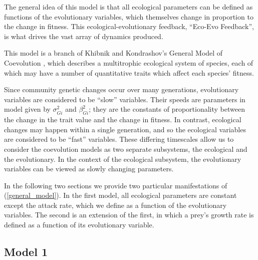 \documentclass{amsart}
\theoremstyle{definition}
\theoremstyle{remark}
\numberwithin{equation}{section}
\begin{document}
The general idea of this model is that all ecological parameters can be defined as functions of the evolutionary variables, which themselves change in proportion to the change in fitness.  This ecological-evolutionary feedback, ``Eco-Evo Feedback'', is what drives the vast array of dynamics produced.

This model is a branch of Khibnik and Kondrashov's General Model of Coevolution \cite{Khibnik_Kondrashov_1997}, which describes a multitrophic ecological system of species, each of which may have a number of quantitative traits which affect each species' fitness.

Since community genetic changes occur over many generations, evolutionary variables are considered to be ``slow'' variables.  Their speeds are parameters in model given by $\sigma_{Gi}^2$ and $\beta_{Gi}^2$; they are the constants of proportionality between the change in the trait value and the change in fitness.  In contrast, ecological changes may happen within a single generation, and so the ecological variables are considered to be ``fast'' variables.  These differing timescales allow us to consider the coevolution models as two separate subsystems, the ecological and the evolutionary.  In the context of the ecological subsystem, the evolutionary variables can be viewed as slowly changing parameters.

In the following two sections we provide two particular manifestations of (\ref{general_model}).  In the first model, all ecological parameters are constant except the attack rate, which we define as a function of the evolutionary variables.  The second is an extension of the first, in which a prey's growth rate is defined as a function of its evolutionary variable.





















\subsection{Model 1}
\end{document}
